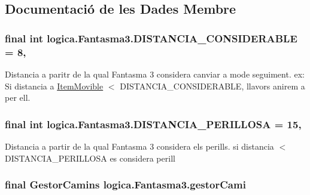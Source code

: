 \subsection{Documentació de les Dades Membre}
\hypertarget{classlogica_1_1_fantasma3_a188d9336f751a28078fc220ee3e61c97}{
\subsubsection[{D\+I\+S\+T\+A\+N\+C\+I\+A\+\_\+\+C\+O\+N\+S\+I\+D\+E\+R\+A\+B\+L\+E}]{\setlength{\rightskip}{0pt plus 5cm}final int logica.\+Fantasma3.\+D\+I\+S\+T\+A\+N\+C\+I\+A\+\_\+\+C\+O\+N\+S\+I\+D\+E\+R\+A\+B\+L\+E = 8\hspace{0.3cm}{\ttfamily [static]}, {\ttfamily [private]}}}\label{classlogica_1_1_fantasma3_a188d9336f751a28078fc220ee3e61c97}
Distancia a paritr de la qual Fantasma 3 considera canviar a mode seguiment. ex\+: Si distancia a \hyperlink{classlogica_1_1_item_movible}{Item\+Movible} $<$ D\+I\+S\+T\+A\+N\+C\+I\+A\+\_\+\+C\+O\+N\+S\+I\+D\+E\+R\+A\+B\+L\+E, llavors anirem a per ell. \hypertarget{classlogica_1_1_fantasma3_a66b467ba2716d3116b05a06e75282b5e}{
\subsubsection[{D\+I\+S\+T\+A\+N\+C\+I\+A\+\_\+\+P\+E\+R\+I\+L\+L\+O\+S\+A}]{\setlength{\rightskip}{0pt plus 5cm}final int logica.\+Fantasma3.\+D\+I\+S\+T\+A\+N\+C\+I\+A\+\_\+\+P\+E\+R\+I\+L\+L\+O\+S\+A = 15\hspace{0.3cm}{\ttfamily [static]}, {\ttfamily [private]}}}\label{classlogica_1_1_fantasma3_a66b467ba2716d3116b05a06e75282b5e}
Distancia a partir de la qual Fantasma 3 considera els perills. si distancia $<$ D\+I\+S\+T\+A\+N\+C\+I\+A\+\_\+\+P\+E\+R\+I\+L\+L\+O\+S\+A es considera perill \hypertarget{classlogica_1_1_fantasma3_a57dabe0804fa3f0ed00b28f3cab4d6b6}{
\subsubsection[{gestor\+Cami}]{\setlength{\rightskip}{0pt plus 5cm}final {\bf Gestor\+Camins} logica.\+Fantasma3.\+gestor\+Cami\hspace{0.3cm}{\ttfamily [private]}}}\label{classlogica_1_1_fantasma3_a57dabe0804fa3f0ed00b28f3cab4d6b6}
